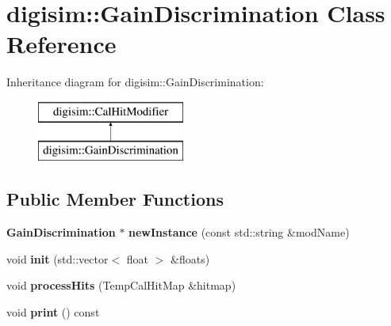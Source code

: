 \section{digisim\-:\-:Gain\-Discrimination Class Reference}
\label{classdigisim_1_1GainDiscrimination}
Inheritance diagram for digisim\-:\-:Gain\-Discrimination\-:\begin{figure}[H]
\begin{center}
\leavevmode
\includegraphics[height=2.000000cm]{classdigisim_1_1GainDiscrimination}
\end{center}
\end{figure}
\subsection*{Public Member Functions}
\begin{DoxyCompactItemize}
\item 
{\bf Gain\-Discrimination} $\ast$ {\bfseries new\-Instance} (const std\-::string \&mod\-Name)\label{classdigisim_1_1GainDiscrimination_aeda4bbdea05a86e08eccb75a86a371c4}

\item 
void {\bfseries init} (std\-::vector$<$ float $>$ \&floats)\label{classdigisim_1_1GainDiscrimination_a940ca3ec22fcafa4b878acb194ba8893}

\item 
void {\bfseries process\-Hits} (Temp\-Cal\-Hit\-Map \&hitmap)\label{classdigisim_1_1GainDiscrimination_a9a870bc250df2bb06ffed3f9307c89a9}

\item 
void {\bfseries print} () const \label{classdigisim_1_1GainDiscrimination_a72ef2d0767db5384296d4097a9614387}

\end{DoxyCompactItemize}
